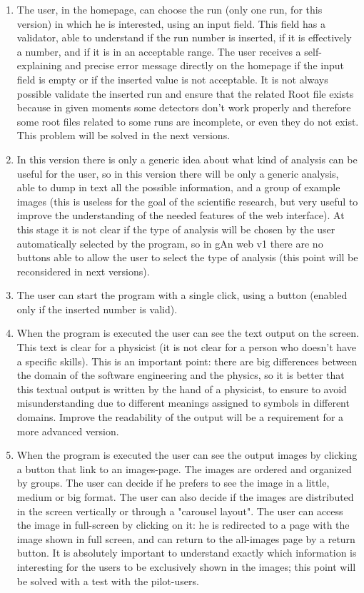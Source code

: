 \begin{enumerate}

\item The user, in the homepage, can choose the run (only one run, for this version) in which he is interested, using an input field. This field has a validator, able to understand if the run number is inserted, if it is effectively a number, and if it is in an acceptable range. The user receives a self-explaining and precise error message directly on the homepage if the input field is empty or if the inserted value is not acceptable. It is not always possible validate the inserted run and ensure that the related Root file exists because in given moments some detectors don't work properly and therefore some root files related to some runs are incomplete, or even they do not exist. This problem will be solved in the next versions.

\item In this version there is only a generic idea about what kind of analysis can be useful for the user, so in this version there will be only a generic analysis, able to dump in text all the possible information, and a group of example images (this is useless for the goal of the scientific research, but very useful to improve the understanding of the needed features of the web interface).
At this stage it is not clear if the type of analysis will be chosen by the user automatically selected by the program, so in gAn web v1 there are no buttons able to allow the user to select the type of analysis (this point will be reconsidered in next versions).

\item The user can start the program with a single click, using a button (enabled only if the inserted number is valid).

\item When the program is executed the user can see the text output on the screen. This text is clear for a physicist (it is not clear for a person who doesn't have a specific skills). This is an important point: there are big differences between the domain of the software engineering and the physics, so it is better that this textual output is written by the hand of a physicist, to ensure to avoid misunderstanding due to different meanings assigned to symbols in different domains. Improve the readability of the output will be a requirement for a more advanced version. 

\item When the program is executed the user can see the output images by clicking a button that link to an images-page. The images are ordered and organized by groups. The user can decide if he prefers to see the image in a little, medium or big format. The user can also decide if the images are distributed in the screen vertically or through a "carousel layout". The user can access the image in full-screen by clicking on it: he is redirected to a page with the image shown in full screen, and can return to the all-images page by a return button. It is absolutely important to understand exactly which information is interesting for the users to be exclusively shown in the images; this point will be solved with a test with the pilot-users. 


\end{enumerate}
